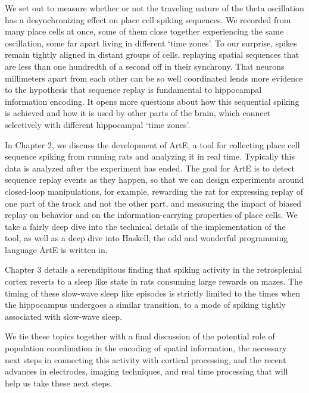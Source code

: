 \documentclass[]{article}
\begin{document}
We set out to measure whether or not the traveling nature of the theta
oscillation has a desynchronizing effect on place cell spiking
sequences. We recorded from many place cells at once, some of them close
together experiencing the same oscillation, some far apart living in
different `time zones'. To our surprise, spikes remain tightly aligned
in distant groups of cells, replaying spatial sequences that are less
than one hundredth of a second off in their synchrony. That neurons
millimeters apart from each other can be so well coordinated lends more
evidence to the hypothesis that sequence replay is fundamental to
hippocampal information encoding. It opens more questions about how this
sequential spiking is achieved and how it is used by other parts of the
brain, which connect selectively with different hippocampal `time
zones'.

In Chapter 2, we discuss the development of ArtE, a tool for collecting
place cell sequence spiking from running rats and analyzing it in real
time. Typically this data is analyzed after the experiment has ended.
The goal for ArtE is to detect sequence replay events as they happen, so
that we can design experiments around closed-loop manipulations, for
example, rewarding the rat for expressing replay of one part of the
track and not the other part, and measuring the impact of biased replay
on behavior and on the information-carrying properties of place cells.
We take a fairly deep dive into the technical details of the
implementation of the tool, as well as a deep dive into Haskell, the odd
and wonderful programming language ArtE is written in.

Chapter 3 details a serendipitous finding that spiking activity in the
retrosplenial cortex reverts to a sleep like state in rats consuming
large rewards on mazes. The timing of these slow-wave sleep like
episodes is strictly limited to the times when the hippocampus undergoes
a similar transition, to a mode of spiking tightly associated with
slow-wave sleep.

We tie these topics together with a final discussion of the potential
role of population coordination in the encoding of spatial information,
the necessary next steps in connecting this activity with cortical
processing, and the recent advances in electrodes, imaging techniques,
and real time processing that will help us take these next steps.
\end{document}
